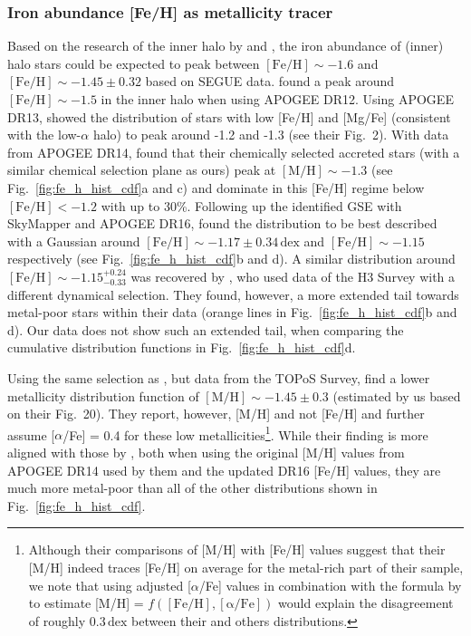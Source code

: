 \documentclass[fleqn,usenatbib]{mnras}
\newcommand{\dex}{\,\mathrm{dex}}	%
\begin{document}
\subsubsection{Iron abundance [Fe/H] as metallicity tracer} \label{sec:gse_stellar_chemistry_fe_h}

Based on the research of the inner halo by \citet{Carollo2007} and \citet{Ivezic2008}, the iron abundance of (inner) halo stars could be expected to peak between $\mathrm{[Fe/H]} \sim -1.6$ and $\mathrm{[Fe/H]} \sim -1.45\pm0.32$ based on SEGUE data. \citet{FernandezAlvar2017} found a peak around $\mathrm{[Fe/H]} \sim -1.5$ in the inner halo when using APOGEE DR12. Using APOGEE DR13, \citet{Hayes2018} showed the distribution of stars with low [Fe/H] and [Mg/Fe] (consistent with the low-$\alpha$ halo) to peak around -1.2 and -1.3 (see their Fig.~2). With data from APOGEE DR14, \citet{Das2020} found that their chemically selected accreted stars (with a similar chemical selection plane as ours) peak at $\mathrm{[M/H]} \sim -1.3$ (see Fig.~\ref{fig:fe_h_hist_cdf}a and c) and dominate in this [Fe/H] regime below $\mathrm{[Fe/H]} < -1.2$ with up to 30\%. Following up the identified GSE with SkyMapper and APOGEE DR16, \citet{Feuillet2020, Feuillet2021} found the distribution to be best described with a Gaussian around $\mathrm{[Fe/H]} \sim -1.17 \pm 0.34\dex$ and $\mathrm{[Fe/H]} \sim -1.15$ respectively (see Fig.~\ref{fig:fe_h_hist_cdf}b and d). A similar distribution around $\mathrm{[Fe/H]} \sim -1.15_{-0.33}^{+0.24}$ was recovered by \citet{Naidu2020}, who used data of the H3 Survey with a different dynamical selection. They found, however, a more extended tail towards metal-poor stars within their data (orange lines in Fig.~\ref{fig:fe_h_hist_cdf}b and d). Our data does not show such an extended tail, when comparing the cumulative distribution functions in Fig.~\ref{fig:fe_h_hist_cdf}d.

Using the same selection as \citet{Feuillet2020}, but data from the TOPoS Survey, \citet{Bonifacio2021} find a lower metallicity distribution function of $\mathrm{[M/H]} \sim -1.45 \pm 0.3$ (estimated by us based on their Fig.~20). They report, however, [M/H] and not [Fe/H] and further assume [$\alpha$/Fe] = 0.4 for these low metallicities\footnote{Although their comparisons of [M/H] with [Fe/H] values suggest that their [M/H] indeed traces [Fe/H] on average for the metal-rich part of their sample, we note that using adjusted [$\alpha$/Fe] values in combination with the formula by \citet{Salaris2006} to estimate [M/H] = $f(\mathrm{[Fe/H]}, \mathrm{[\alpha/Fe]})$ would explain the disagreement of roughly $0.3 \dex$ between their and others distributions.}. While their finding is more aligned with those by \citet{Das2020}, both when using the original [M/H] values from APOGEE DR14 used by them and the updated DR16 [Fe/H] values, they are much more metal-poor than all of the other distributions shown in Fig.~\ref{fig:fe_h_hist_cdf}.
\end{document}
